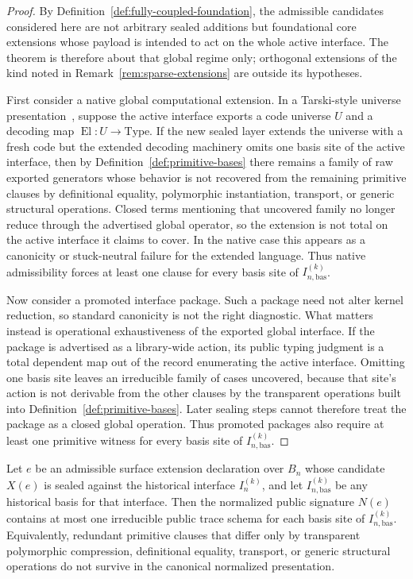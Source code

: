 \documentclass{lmcs}
\begin{document}
\begin{proof}
By Definition~\ref{def:fully-coupled-foundation}, the admissible candidates considered here
are not arbitrary sealed additions but foundational core extensions whose payload is intended
to act on the whole active interface.  The theorem is therefore about that global regime only;
orthogonal extensions of the kind noted in Remark~\ref{rem:sparse-extensions} are outside its
hypotheses.

First consider a native global computational extension.  In a Tarski-style universe
presentation~\cite{martinlof-itt}, suppose the active interface exports a code universe \(U\)
and a decoding map
\(\operatorname{El}:U\to\mathrm{Type}\).  If the new sealed layer extends the universe with a
fresh code but the extended decoding machinery omits one basis site of the active interface,
then by Definition~\ref{def:primitive-bases} there remains a family of raw exported generators
whose behavior is not recovered from the remaining primitive clauses by definitional equality, polymorphic
instantiation, transport, or generic structural operations.  Closed terms mentioning that
uncovered family no longer reduce through the advertised global operator, so the extension
is not total on the active interface it claims to cover.  In the native case this appears as a
canonicity or stuck-neutral failure for the extended language.  Thus native admissibility
forces at least one clause for every basis site of \(I_{n,\mathrm{bas}}^{(k)}\).

Now consider a promoted interface package.  Such a package need not alter kernel reduction,
so standard canonicity is not the right diagnostic.  What matters instead is operational
exhaustiveness of the exported global interface.  If the package is advertised as a
library-wide action, its public typing judgment is a total dependent map out of the record
enumerating the active interface.  Omitting one basis site leaves an irreducible family of
cases uncovered, because that site's action is not derivable from the other clauses by the
transparent operations built into Definition~\ref{def:primitive-bases}.  Later sealing steps
cannot therefore treat the package as a closed global operation.  Thus promoted packages also
require at least one primitive witness for every basis site of \(I_{n,\mathrm{bas}}^{(k)}\).
\end{proof}

\begin{prop}
\label{prop:basis-minimal}
Let \(e\) be an admissible surface extension declaration over \(B_n\) whose candidate
\(X(e)\) is sealed against the historical interface \(I_n^{(k)}\), and let
\(I_{n,\mathrm{bas}}^{(k)}\) be any historical basis for that interface.  Then the normalized public
signature \(N(e)\) contains at most one irreducible public trace schema for each basis site of
\(I_{n,\mathrm{bas}}^{(k)}\).  Equivalently, redundant primitive clauses that differ only by
transparent polymorphic compression, definitional equality, transport, or generic structural
operations do not survive in the canonical normalized presentation.
\end{prop}
\end{document}
